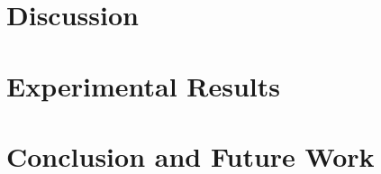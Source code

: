 \documentclass{article} %
\begin{document}
\section{Discussion} 

\section{Experimental Results}

\section{Conclusion and Future Work}



\end{document}
